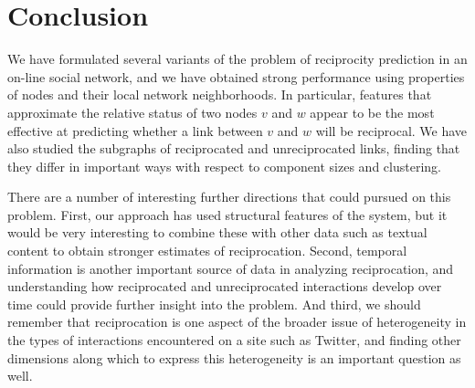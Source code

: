 \documentclass[conference]{IEEEtran}
\begin{document}
\section{Conclusion}

We have formulated several variants of the problem of 
reciprocity prediction in an on-line social network, and we
have obtained strong performance
using properties of nodes and their local network neighborhoods.
In particular, features that approximate the relative status of
two nodes $v$ and $w$ appear to be the most effective at 
predicting whether a link between $v$ and $w$ will be reciprocal.
We have also studied the subgraphs of reciprocated and unreciprocated
links, finding that they differ in important ways with respect
to component sizes and clustering.

There are a number of interesting further directions that could
pursued on this problem.
First, our approach has used structural features of the system,
but it would be very interesting to combine these with other
data such as textual content to obtain
stronger estimates of reciprocation.
Second, temporal information is another important source of data
in analyzing reciprocation, and understanding how reciprocated
and unreciprocated interactions develop over time could provide
further insight into the problem.
And third, we should remember that reciprocation is one aspect of
the broader issue of heterogeneity in the types of interactions
encountered on a site such as Twitter, and finding other
dimensions along which to express this heterogeneity is an 
important question as well.






\end{document}
